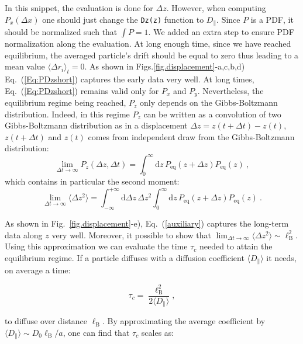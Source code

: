 In this snippet, the evaluation is done for $\Delta z$. However, when computing $P_x(\Delta x)$ one should just change the \texttt{Dz(z)} function to $D_\parallel$. Since $P$ is a \gls{PDF}, it should be normalized such that $\int P = 1$. We added an extra step to ensure \gls{PDF} normalization along the evaluation.
At long enough time, since we have reached equilibrium, the averaged particle's drift should be equal to zero thus leading to a mean value $\langle \Delta r_i \rangle_t  = 0$. As shown in Figs.\ref{fig.displacement}-a,c,b,d) Eq.~(\ref{Eq:PDzshort}) captures the early data very well. At long times, Eq.~(\ref{Eq:PDzshort}) remains valid only for $P_x$ and $P_y$. Nevertheless, the equilibrium regime being reached, $P_z$ only depends on the Gibbs-Boltzmann distribution. Indeed, in this regime $P_z$ can be written as a convolution of two Gibbs-Boltzmann distribution as in a displacement $\Delta z = z(t+\Delta t) - z(t)$, $ z(t+\Delta t)$ and  $z(t)$ comes from independent draw from the Gibbs-Boltzmann distribution:
\begin{equation}
	\lim_{\Delta t\rightarrow\infty}P_z(\Delta z, \Delta t) = \int_0^{\infty}\textrm{d}z\,P_{\textrm{eq}}(z+\Delta z)P_{\textrm{eq}}(z)\ ,
	\label{auxiliary}
\end{equation}
which contains in particular the second moment:
\begin{equation}
	\lim_{\Delta t\rightarrow\infty}\langle\Delta z ^2\rangle = \int _{- \infty} ^{+ \infty}\textrm{d}\Delta z\, \Delta z^2\int_0^{\infty}\textrm{d}z\, P_{\textrm{eq}}(z+\Delta z)P_{\textrm{eq}}(z) \ .   
	\label{Eq:plateau}
\end{equation}

As shown in Fig.~\ref{fig.displacement}-e), Eq.~(\ref{auxiliary}) captures the long-term data along $z$ very well. Moreover, it possible to show that $\lim_{\Delta t\rightarrow\infty}\langle\Delta z ^2\rangle \sim \ell _\mathrm{B}^2$. Using this approximation we can evaluate the time $\tau_c$ needed to attain the equilibrium regime. If a particle diffuses with a diffusion coefficient $\langle D_\parallel \rangle$ it needs, on average a time: 

\begin{equation}
	\tau_c = \frac{\ell_\mathrm{B}^2}{2\langle D_\parallel \rangle},
\end{equation}

to diffuse over distance $\ell_\mathrm{B}$. By approximating the average coefficient by $\langle D_\parallel \rangle \sim D_0 \ell_\mathrm{B}/ a $, one can find that $\tau_c$ scales as:

